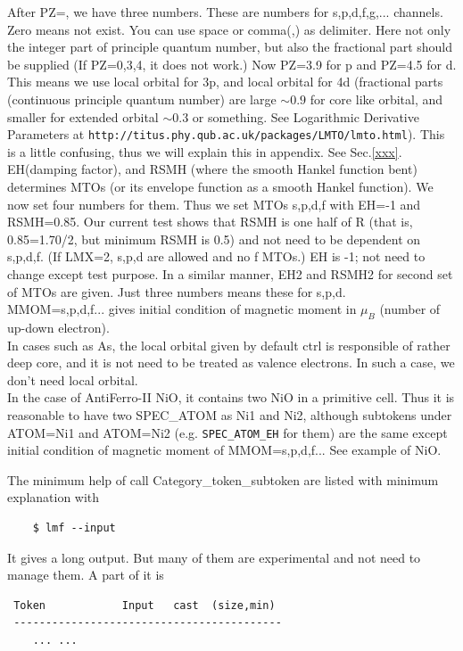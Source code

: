{\begin{itemize}
After PZ=, we have three numbers.
These are numbers for s,p,d,f,g,... channels. Zero means not exist.
You can use space or comma(,) as delimiter. 
Here not only the integer part of principle quantum number, but also 
the fractional part should be supplied (If PZ=0,3,4, it does not work.)
Now PZ=3.9 for p and PZ=4.5 for d. This means we use local orbital for
3p, and local orbital for 4d (fractional parts (continuous principle quantum number) 
are large $\sim 0.9$ for core like orbital, and smaller for extended
orbital $\sim 0.3$ or something. See Logarithmic Derivative Parameters
at \verb+http://titus.phy.qub.ac.uk/packages/LMTO/lmto.html+).
This is a little confusing, thus we will explain this in appendix. See Sec.\ref{xxx}.\\

EH(damping factor), and RSMH (where the smooth Hankel function bent)
determines MTOs (or its envelope function as a smooth Hankel function). 
We now set four numbers for them. Thus we set MTOs
s,p,d,f with EH=-1 and RSMH=0.85. Our current test shows that RSMH is
one half of R (that is, 0.85=1.70/2, but minimum RSMH is 0.5) 
and not need to be dependent on s,p,d,f. (If LMX=2, s,p,d are allowed and no f MTOs.)
EH is -1; not need to change except test purpose.
In a similar manner, EH2 and RSMH2 for second set of MTOs are given.
Just three numbers means these for s,p,d. \\

MMOM=s,p,d,f... gives initial condition of magnetic moment in $\mu_B$
(number of up-down electron).\\

In cases such as As, the local orbital given by default ctrl
is responsible of rather deep core, and it is not need to be treated 
as valence electrons. In such a case,
we don't need local orbital.\\

In the case of AntiFerro-II NiO, it contains 
two NiO in a primitive cell. Thus it is reasonable to have two SPEC\_ATOM
as Ni1 and Ni2, although subtokens under
ATOM=Ni1 and ATOM=Ni2 (e.g. \verb+SPEC_ATOM_EH+ for them) are the same
except initial condition of magnetic moment of MMOM=s,p,d,f...
See example of NiO.
\end{itemize}

The minimum help of call Category\_token\_subtoken are listed with
minimum explanation with 
\begin{verbatim}
    $ lmf --input
\end{verbatim}
It gives a long output. But many of them are experimental and not need
to manage them. A part of it is
\begin{verbatim}
 Token            Input   cast  (size,min)
 ------------------------------------------
    ... ...


\end{verbatim}}
